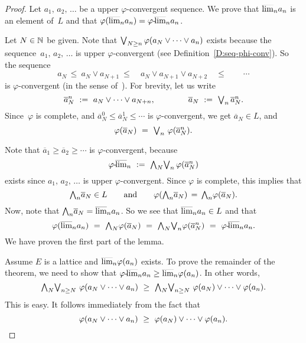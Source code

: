 \documentclass[main.tex]{subfiles}
\begin{document}
\begin{proof}
Let $a_1,\,a_2,\,\dotsc$ be a upper $\varphi$-convergent sequence.
We prove that $\smash{\overline{\lim}_{n}}a_n$ is an element of~$L$
and that $\varphi(\smash{\overline{\lim}_{n}}a_n) = {\varphi}\text{-}\!\smash{\overline{\lim}_{n}}a_n$.

Let $N\in\mathbb{N}$ be given.
Note that $\textstyle{\bigvee}_{N\geq n} \,\varphi(a_N\vee\dotsb\vee a_n)$
exists because the sequence~$a_1,\,a_2,\,\dotsc$ is upper $\varphi$-convergent
(see Definition~\ref{D:seq-phi-conv}).
So the sequence
\begin{equation*}
a_N \,\leq\ a_N \vee a_{N+1} 
    \ \leq\quad a_N\vee a_{N+1} \vee a_{N+2} 
    \quad \leq\qquad \dotsb
\end{equation*}
is $\varphi$-convergent (in the sense of~).
For brevity,
let us write
\begin{equation*}
\overline{a}_{N}^n \ := \ a_N\vee\dotsb\vee a_{N+n},
\qquad\qquad
\overline{a}_N \ := \ \textstyle{\bigvee}_n \,\overline{a}_N^n.
\end{equation*}
Since~$\varphi$ is complete,
and $\overline{a}_N^0 \leq \overline{a}_N^1 \leq\dotsb$
is $\varphi$-convergent,
we get $\overline{a}_N\in L$,
and 
\begin{equation*}
\varphi(\overline{a}_N) 
\ =\ 
 \bv_{n}\ \varphi( \overline{a}_N^n).
\end{equation*}

Note that $\overline{a}_1 \geq \overline{a}_2 \geq\dotsb$
is $\varphi$-convergent,
because
\begin{equation*}
\pulim\varphi{n}
\ \eqdf\ 
\bw_N\bv_n\, \varphi(\overline{a}^n_N)
\end{equation*}
exists since $a_1,\,a_2,\,\dotsc$ is upper $\varphi$-convergent.
Since $\varphi$ is complete,
this implies that
\begin{equation*}
\textstyle{\bigwedge}_n \overline{a}_N \in L
\qquad\text{and}\qquad \varphi(\textstyle{\bigwedge}_n \overline{a}_N)
\,=\,
\textstyle{\bigwedge}_n\varphi(\overline{a}_N).
\end{equation*}
Now,
note that $\textstyle{\bigwedge}_n \overline{a}_N = \smash{\overline{\lim}_{n}}a_n$.
So we see that $\smash{\overline{\lim}_{n}}a_n\in L$ and that
\begin{equation*}
\varphi(\ulim{n}a_n)
\ =\ 
\bw_N\varphi(\overline{a}_N)
\ =\ 
\bw_N \bv_n \varphi(\overline{a}^n_N)
\ =\ 
\pulim\varphi{n} a_n.
\end{equation*}
We have proven the first part of the lemma.

Assume $E$ is a lattice and $\smash{\overline{\lim}_{n}}\varphi(a_n)$ exists.
To prove the remainder of the theorem,
we need to show that 
${\varphi}\text{-}\!\smash{\overline{\lim}_{n}}a_n \geq \smash{\overline{\lim}_{n}}\varphi(a_n)$.
In other words,
\begin{equation*}
\bw_N \bv_{n\geq N} \ \varphi(a_N \vee \dotsb \vee a_n)
\ \geq \ 
\bw_N \bv_{n\geq N} \ \varphi(a_N) \vee \dotsb \vee \varphi(a_n).
\end{equation*}
This is easy.  It follows immediately
from the fact that
\begin{equation*}
\varphi(a_N\vee \dotsb\vee a_n)
\ \geq\ \varphi(a_N)\vee \dotsb \vee \varphi(a_n).\qedhere
\end{equation*}
\end{proof}
\end{document}

